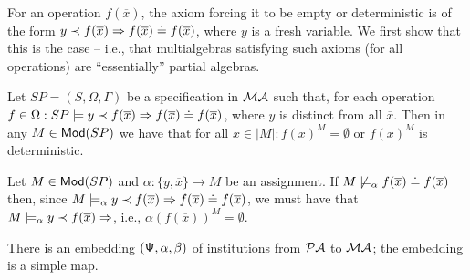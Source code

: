 \documentclass[10pt]{article}
\begin{document}
For an operation $f(\overline x)$, the axiom forcing it to be empty or
deterministic is of the form $y\prec f(\overline x)\Rightarrow f(\overline x)\mathrel{\dot{=} }
f(\overline x)$, where $y$ is a fresh variable. We first show that this is
the case -- i.e., that
multialgebras satisfying such axioms (for all operations) are ``essentially''
partial algebras.
\begin{lemma}\label{le:esspa}
Let $SP=(S,\Omega,\Gamma)$ be a specification in ${\mathcal{MA}}$ such that, for
each operation $f\in\Omega:  
SP\models y \prec f(\overline{x}) \Rightarrow f(\overline{x}) \mathrel{\dot{=} } f(\overline{x})$,
where $y$ is distinct from all $\overline x$.
Then in any $M\in{\sf {Mod}}(SP)$ we have that for all $\overline x\in|M|:f(\overline{x})^M=\emptyset$ or
$f(\overline x)^M$ is deterministic.
\end{lemma}
\begin{PROOF}
Let $M\in{\sf {Mod}}(SP)$ and $\alpha:\{y,\overline x\}\to M$ be an assignment. If
$M\not\models_\alpha f(\overline{x}) \mathrel{\dot{=} } f(\overline{x})$ then, since
$M\models_\alpha y\prec f(\overline x)\Rightarrow f(\overline x)\mathrel{\dot{=} } f(\overline x)$,
we must have that $M\models_\alpha y\prec f(\overline x)\Rightarrow$, i.e., 
$\alpha(f(\overline x))^M=\emptyset$.
\end{PROOF}
%
%
\begin{proposition}\label{prop:PaMa}
There is an embedding $({\sf {\Psi}},\alpha, \beta)$ of institutions from
${\mathcal{PA}}$ to ${\mathcal{MA}}$; the embedding is a simple map.
\end{proposition}
%
\end{document}
